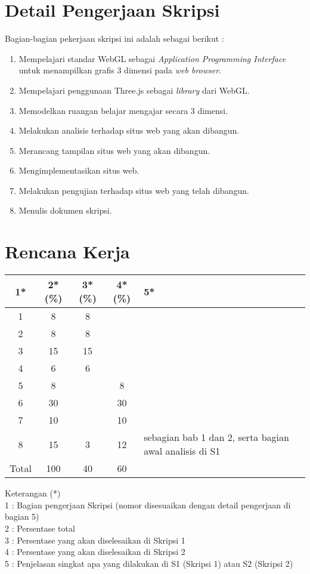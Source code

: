 \documentclass[a4paper,twoside]{article}
\begin{document}
\section{Detail Pengerjaan Skripsi}
Bagian-bagian pekerjaan skripsi ini adalah sebagai berikut :
	\begin{enumerate}
		\item Mempelajari standar WebGL sebagai {\it Application Programming Interface} untuk menampilkan grafis 3 dimensi pada {\it web browser}.
		\item Mempelajari penggunaan Three.js sebagai {\it library} dari WebGL.
		\item Memodelkan ruangan belajar mengajar secara 3 dimensi.
		\item Melakukan analisis terhadap situs web yang akan dibangun.
		\item Merancang tampilan situs web yang akan dibangun.
		\item Mengimplementasikan situs web.
		\item Melakukan pengujian terhadap situs web yang telah dibangun.
		\item Menulis dokumen skripsi.
	\end{enumerate}

\section{Rencana Kerja}
\begin{center}
  \begin{tabular}{ | c | c | c | c | l |}
    \hline
    1*  & 2*(\%) & 3*(\%) & 4*(\%) &5*\\ \hline \hline
    1    & 8 & 8 &  &  \\ \hline
    2    & 8 & 8 &  &  \\ \hline
    3    & 15 & 15 &  &  \\ \hline
    4    & 6 & 6 &  &  \\ \hline
    5    & 8 &  & 8 &  \\ \hline
    6    & 30 &  & 30 &  \\ \hline
    7    & 10 &  & 10 &  \\ \hline
    8    & 15 & 3 & 12 & sebagian bab 1 dan 2, serta bagian awal analisis di S1 \\ \hline
    Total   & 100 & 40 & 60 &  \\ \hline
   \end{tabular}
\end{center}

Keterangan (*)\\
1 : Bagian pengerjaan Skripsi (nomor disesuaikan dengan detail pengerjaan di bagian 5)\\
2 : Persentase total \\
3 : Persentase yang akan diselesaikan di Skripsi 1 \\
4 : Persentase yang akan diselesaikan di Skripsi 2 \\
5 : Penjelasan singkat apa yang dilakukan di S1 (Skripsi 1) atau S2 (Skripsi 2)
\end{document}

